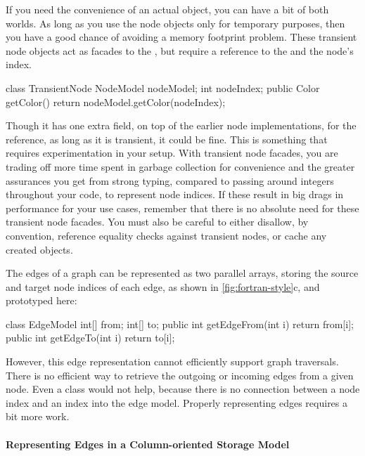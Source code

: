 If you need the convenience of an actual  object, you can have a
bit of both worlds. As long as you use the node objects
only for temporary purposes, then you have a good chance of avoiding a memory
footprint problem. These transient node objects act as facades to the
, but require a reference to the  and the
node's index. 
\begin{shortlisting}
class TransientNode {
   NodeModel nodeModel;
   int nodeIndex;
   public Color getColor() {
      return nodeModel.getColor(nodeIndex);
   }
}
\end{shortlisting}
Though it has one extra field, on top of the earlier node implementations, for
the  reference, as long as it is transient, it could be fine.
This is something that requires experimentation in your setup. With transient
node facades, you are trading off more time spent in garbage collection for
convenience and the greater assurances you get from strong typing, compared to
passing around integers throughout your code, to represent node indices.
If these result in big drags in performance for your use cases, remember
that there is no absolute need for these transient node facades. You must also
be careful to either disallow, by convention, reference equality checks against
transient nodes, or cache any created objects.

The edges of a graph can be represented as two parallel arrays, storing the
source and target node indices of each edge, as shown in
\autoref{fig:fortran-style}c, and prototyped here:
\begin{shortlisting}
class EdgeModel {
   int[] from;
   int[] to;
   public int getEdgeFrom(int i) {
      return from[i];
   }
   public int getEdgeTo(int i) {
      return to[i];
   }
}
\end{shortlisting}
However, this edge representation cannot efficiently support graph
traversals. There is no efficient way to retrieve the outgoing or
incoming edges from a given node. Even a  class would not
help, because there is no connection between a node index and an index
into the edge model. Properly representing edges requires a bit more work. 

\paragraph{Representing Edges in a Column-oriented Storage Model}

